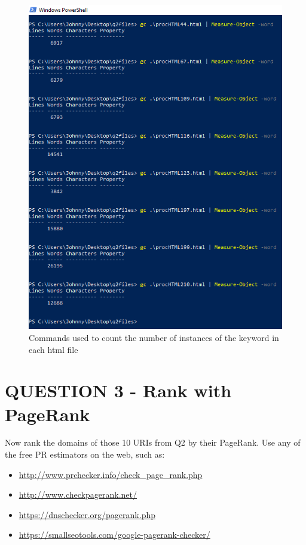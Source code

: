 \documentclass[12pt]{article}
\begin{document}
\begin{figure}[h!]
    \centering
    \includegraphics[trim=0 0 0 0, clip, width=\textwidth] {ps-queries.png}
    \caption{Commands used to count the number of instances of the keyword in each html file}
    \label{fig:ps-queries}
\end{figure}

\newpage
\section*{QUESTION 3 - Rank with PageRank}
Now rank the domains of those 10 URIs from Q2 by their PageRank. Use any of the free PR estimators on the web, such as:

\begin{itemize}
    \item \url{http://www.prchecker.info/check_page_rank.php}
    \item \url{http://www.checkpagerank.net/}
    \item \url{https://dnschecker.org/pagerank.php}
    \item \url{https://smallseotools.com/google-pagerank-checker/}
\end{itemize}
\end{document}
